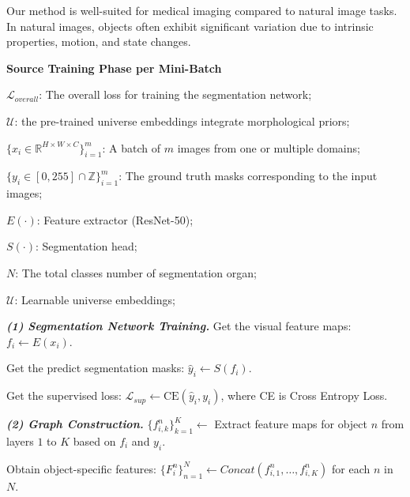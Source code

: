 Our method is well-suited for medical imaging compared to natural image tasks. In natural images, objects often exhibit significant variation due to intrinsic properties, motion, and state changes. 


\begin{algorithm*}
    \caption{\textbf{Source Training Phase per Mini-Batch}}
    \renewcommand{\algorithmicrequire}{\textbf{Input:}}     \renewcommand{\algorithmicensure}{\textbf{Output:}}
    
    \begin{algorithmic}[1]
        \ENSURE 
        $\mathcal{L}_{overall}$: The overall loss for training the segmentation network;

        $\mathcal{U}$: the pre-trained universe embeddings integrate morphological priors;
        

        \REQUIRE 
        $\{ x_i \in \mathbb{R}^{H\times W\times C} \}_{i=1}^m$: A batch of $m$ images from one or multiple domains;

        $\{ y_i \in [0,255] \cap \mathbb{Z} \}_{i=1}^m$: The ground truth masks corresponding to the input images;

        $E(\cdot)$: Feature extractor (ResNet-50);

        $S(\cdot)$: Segmentation head;

        $N$: The total classes number of segmentation organ;

        $\mathcal{U}$: Learnable universe embeddings;
        
        \textit{\textbf{(1) Segmentation Network Training.}}
        \STATE Get the visual feature maps: $f_i \leftarrow E(x_i)$.

        \STATE Get the predict segmentation masks: $\hat{y}_i \leftarrow S(f_i)$.

        \STATE Get the supervised loss: $\mathcal{L}_{sup} \leftarrow \text{CE}(\hat{y}_i, y_i)$, where CE is Cross Entropy Loss.

        \textit{\textbf{(2) Graph Construction.}}
                \STATE $\{f_{i,k}^n\}_{k=1}^{K} \leftarrow$ Extract feature maps for object $n$ from layers $1$ to $K$ based on $f_i$ and $y_i$.
            \ENDFOR
        
            \STATE Obtain object-specific features: $\{F_{i}^n\}_{n=1}^N \leftarrow Concat(f_{i,1}^n, \dots, f_{i,K}^n)$ for each $n$ in $N$.
        

\end{algorithmic}
\end{algorithm*}

